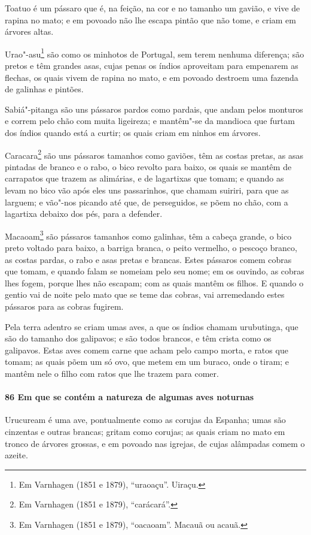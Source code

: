 \begin{linenumbers}
Toatuo é um pássaro que é, na feição, na cor e no tamanho um gavião, e vive de rapina no
mato; e em povoado não lhe escapa pintão que não tome, e criam em árvores altas.

Urao"-asu\footnote{ Em Varnhagen (1851 e 1879), ``uraoaçu''. Uiraçu.} são como os minhotos
de Portugal, sem terem nenhuma diferença; são pretos e têm grandes asas, cujas penas os
índios aproveitam para empenarem as flechas, os quais vivem de rapina no mato, e em
povoado destroem uma fazenda de galinhas e pintões.

Sabiá"-pitanga são uns pássaros pardos como pardais, que andam pelos monturos e correm pelo
chão com muita ligeireza; e mantêm"-se da mandioca que furtam dos índios quando está a
curtir; os quais criam em ninhos em árvores.

Caracara\footnote{ Em Varnhagen (1851 e 1879), ``carácará''.} são uns pássaros tamanhos
como gaviões, têm as costas pretas, as asas pintadas de branco e o rabo, o bico revolto
para baixo, os quais se mantêm de carrapatos que trazem as alimárias, e de lagartixas que
tomam; e quando as levam no bico vão após eles uns passarinhos, que chamam suiriri, para
que as larguem; e vão"-nos picando até que, de perseguidos, se põem no chão, com a
lagartixa debaixo dos pés, para a defender.

Macaoam\footnote{ Em Varnhagen (1851 e 1879), ``oacaoam''. Macauã ou acauã.} são pássaros
tamanhos como galinhas, têm a cabeça grande, o bico preto voltado para baixo, a barriga
branca, o peito vermelho, o pescoço branco, as costas pardas, o rabo e asas pretas e
brancas. Estes pássaros comem cobras que tomam, e quando falam se nomeiam pelo seu nome;
em os ouvindo, as cobras lhes fogem, porque lhes não escapam; com as quais mantêm os
filhos. E quando o gentio vai de noite pelo mato que se teme das cobras, vai arremedando
estes pássaros para as cobras fugirem.

Pela terra adentro se criam umas aves, a que os índios chamam urubutinga, que são do
tamanho dos galipavos; e são todos brancos, e têm crista como os galipavos. Estas aves
comem carne que acham pelo campo morta, e ratos que tomam; as quais põem um só ovo, que
metem em um buraco, onde o tiram; e mantêm nele o filho com ratos que lhe trazem para
comer.

\paragraph{86 Em que se contém a natureza de algumas aves noturnas}\quad
Urucuream é uma ave, pontualmente como as corujas da Espanha; umas são cinzentas e outras
brancas; gritam como corujas; as quais criam no mato em tronco de árvores grossas, e em
povoado nas igrejas, de cujas alâmpadas comem o azeite.


\end{linenumbers}
